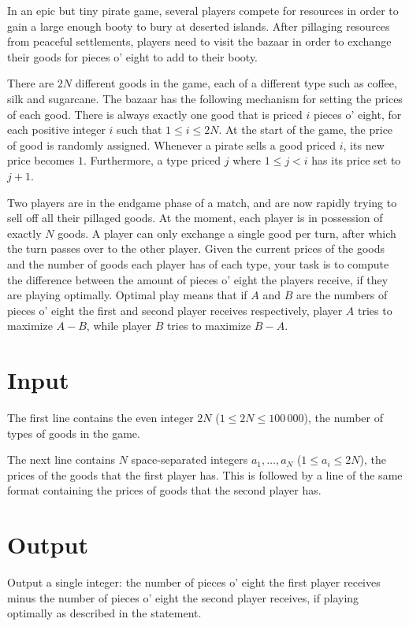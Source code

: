 In an epic but tiny pirate game, several players compete for resources in order to gain a large enough booty to bury at deserted islands.
After pillaging resources from peaceful settlements, players need to visit the bazaar in order to exchange their goods for pieces o' eight to add to their booty.

There are $2N$ different goods in the game, each of a different type such as coffee, silk and sugarcane.
The bazaar has the following mechanism for setting the prices of each good.
There is always exactly one good that is priced $i$ pieces o' eight, for each positive integer $i$ such that $1 \le i \le 2N$.
At the start of the game, the price of good is randomly assigned.
Whenever a pirate sells a good priced $i$, its new price becomes $1$.
Furthermore, a type priced $j$ where $1 \le j < i$ has its price set to $j + 1$.

Two players are in the endgame phase of a match, and are now rapidly trying to sell off all their pillaged goods.
At the moment, each player is in possession of exactly $N$ goods.
A player can only exchange a single good per turn, after which the turn passes over to the other player.
Given the current prices of the goods and the number of goods each player has of each type, your task is to compute the difference between the amount of pieces o' eight the players receive, if they are playing optimally.
Optimal play means that if $A$ and $B$ are the numbers of pieces o' eight the first and second player receives respectively, player $A$ tries to maximize $A - B$, while player $B$ tries to maximize $B - A$.

\section*{Input}
The first line contains the even integer $2N$ ($1 \le 2N \le 100\,000$), the number of types of goods in the game.

The next line contains $N$ space-separated integers $a_1, \dots, a_N$ ($1 \le a_i \le 2N$), the prices of the goods that the first player has.
This is followed by a line of the same format containing the prices of goods that the second player has.

\section*{Output}
Output a single integer: the number of pieces o' eight the first player receives minus the number of pieces o' eight the second player receives, if playing optimally as described in the statement.

